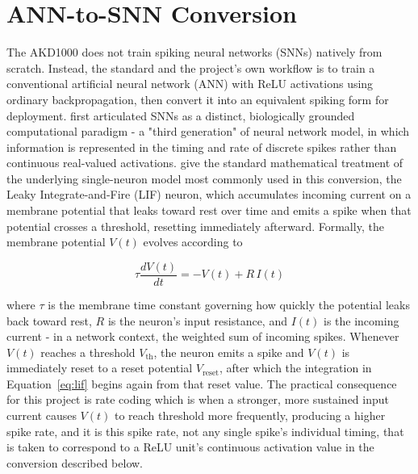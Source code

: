 \section{ANN-to-SNN Conversion}
\label{sec:ann-snn-conversion}

The AKD1000 does not train spiking neural networks (SNNs) natively from scratch. Instead, the standard and the project's own workflow is to train a conventional artificial neural network (ANN) with ReLU activations using ordinary backpropagation, then convert it into an equivalent spiking form for deployment. \citet{maass1997} first articulated SNNs as a distinct, biologically grounded computational paradigm - a "third generation" of neural network model, in which information is represented in the timing and rate of discrete spikes rather than continuous real-valued activations. \citet{gerstner2002} give the standard mathematical treatment of the underlying single-neuron model most commonly used in this conversion, the Leaky Integrate-and-Fire (LIF) neuron, which accumulates incoming current on a membrane potential that leaks toward rest over time and emits a spike when that potential crosses a threshold, resetting immediately afterward. Formally, the membrane potential $V(t)$ evolves according to

\begin{equation}
\tau \frac{dV(t)}{dt} = -V(t) + R\,I(t)
\label{eq:lif}
\end{equation}

\noindent where $\tau$ is the membrane time constant governing how quickly the potential leaks back toward rest, $R$ is the neuron's input resistance, and $I(t)$ is the incoming current - in a network context, the weighted sum of incoming spikes. Whenever $V(t)$ reaches a threshold $V_{\text{th}}$, the neuron emits a spike and $V(t)$ is immediately reset to a reset potential $V_{\text{reset}}$, after which the integration in Equation~\ref{eq:lif} begins again from that reset value. The practical consequence for this project is rate coding which is when a stronger, more sustained input current causes $V(t)$ to reach threshold more frequently, producing a higher spike rate, and it is this spike rate, not any single spike's individual timing, that is taken to correspond to a ReLU unit's continuous activation value in the conversion described below.


